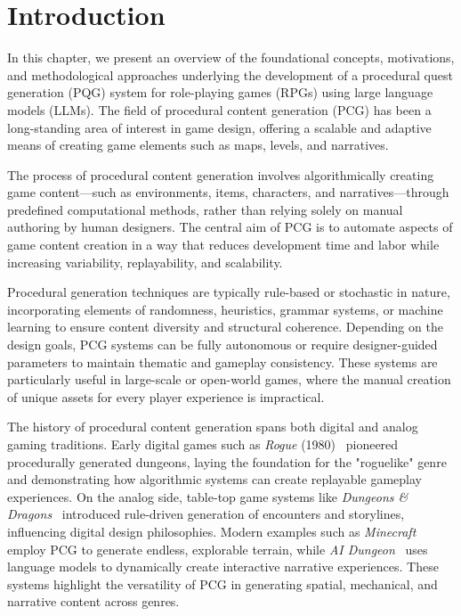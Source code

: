 \clearpage

\chapter{Introduction}

In this chapter, we present an overview of the foundational concepts, motivations, and
methodological approaches underlying the development of a procedural quest generation
(PQG) system for role-playing games (RPGs) using large language models (LLMs). The
field of procedural content generation (PCG) has been a long-standing area of interest in
game design, offering a scalable and adaptive means of creating game elements such as
maps, levels, and narratives.

The process of procedural content generation involves algorithmically creating game
content—such as environments, items, characters, and narratives—through predefined
computational methods, rather than relying solely on manual authoring by human designers.
The central aim of PCG is to automate aspects of game content creation in a
way that reduces development time and labor while increasing variability, replayability,
and scalability.

Procedural generation techniques are typically rule-based or stochastic in nature, incorporating
elements of randomness, heuristics, grammar systems, or machine learning to
ensure content diversity and structural coherence. Depending on the design goals, PCG
systems can be fully autonomous or require designer-guided parameters to maintain thematic
and gameplay consistency. These systems are particularly useful in large-scale or
open-world games, where the manual creation of unique assets for every player experience
is impractical.

The history of procedural content generation spans both digital and analog gaming
traditions. Early digital games such as \textit{Rogue} (1980)~\cite{rogue1980} pioneered procedurally generated
dungeons, laying the foundation for the "roguelike" genre and demonstrating how
algorithmic systems can create replayable gameplay experiences. On the analog side,
table-top game systems like \textit{Dungeons \& Dragons}~\cite{dungeonsanddragons} introduced rule-driven generation of
encounters and storylines, influencing digital design philosophies. Modern examples such
as \textit{Minecraft}~\cite{minecraft} employ PCG to generate endless, explorable terrain, while \textit{AI Dungeon}~\cite{ai-dungeon}
uses language models to dynamically create interactive narrative experiences. These
systems highlight the versatility of PCG in generating spatial, mechanical, and narrative
content across genres.

